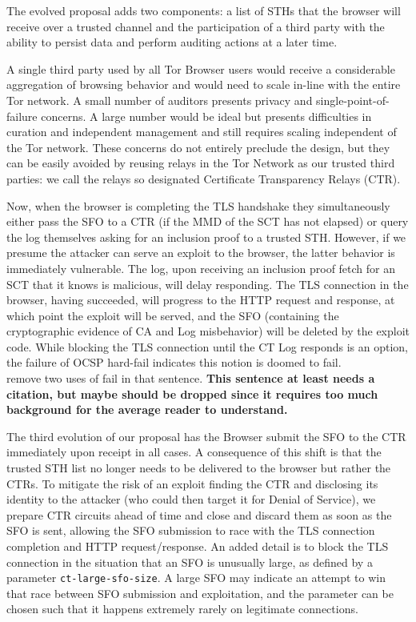 The evolved proposal adds two components: a list of STHs that the browser will
receive over a trusted channel and the participation of a third party with the
ability to persist data and perform auditing actions at a later time.

A single third party used by all Tor Browser users would receive a considerable
aggregation of browsing behavior and would need to scale in-line with the entire
Tor network. A small number of auditors presents privacy and
single-point-of-failure concerns. A large number would be ideal but presents
difficulties in curation and independent management and still requires scaling
independent of the Tor network. These concerns do not entirely preclude the
design, but they can be easily avoided by reusing relays in the Tor Network as
our trusted third parties: we call the relays so designated Certificate
Transparency Relays (CTR).

Now, when the browser is completing the TLS handshake they simultaneously either
pass the SFO to a CTR (if the MMD of the SCT has not elapsed) or query the log
themselves asking for an inclusion proof to a trusted STH\@.  However, if we
presume the attacker can serve an exploit to the browser, the latter behavior is
immediately vulnerable. The log, upon receiving an inclusion proof fetch for an
SCT that it knows is malicious, will delay responding. The TLS connection in the
browser, having succeeded, will progress to the HTTP request and response, at
which point the exploit will be served, and the SFO (containing the
cryptographic evidence of CA and Log misbehavior) will be deleted by the exploit
code. While blocking the TLS connection until the CT Log responds is an option,
the failure of OCSP hard-fail indicates this notion is doomed to fail.\\ %
remove two uses of fail in that sentence. {\bf \color{red}This sentence at least
needs a citation, but maybe should be dropped since it requires too much
background for the average reader to understand.}

The third evolution of our proposal has the Browser submit the SFO to the CTR
immediately upon receipt in all cases. A consequence of this shift is that the
trusted STH list no longer needs to be delivered to the browser but rather the
CTRs. To mitigate the risk of an exploit finding the CTR and disclosing its
identity to the attacker (who could then target it for Denial of Service), we
prepare CTR circuits ahead of time and close and discard them as soon as the SFO
is sent, allowing the SFO submission to race with the TLS connection completion
and HTTP request/response.  An added detail is to block the TLS connection in
the situation that an SFO is unusually large, as defined by a parameter
\texttt{ct-large-sfo-size}. A large SFO may indicate an attempt to win that race
between SFO submission and exploitation, and the parameter can be chosen such
that it happens extremely rarely on legitimate connections.

